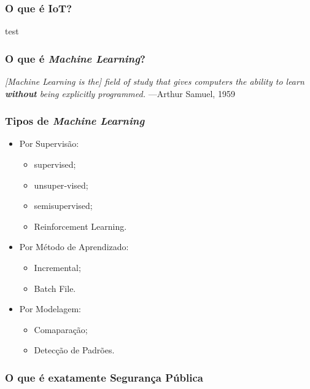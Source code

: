 \begin{frame}
	\frametitle{O que é IoT?}
	test
\end{frame}

\begin{frame}
	\frametitle{O que é \textit{Machine Learning}?}
	\textit{[Machine  Learning  is  the]  field  of  study  that  gives  computers  the  ability  to  learn
	\textbf{without} being explicitly programmed.}
	—Arthur Samuel, 1959
\end{frame}

\begin{frame}
	\frametitle{Tipos de \textit{Machine Learning}}
	\begin{itemize}[<+->]
		\item Por Supervisão:
			\begin{itemize}[<+->]
				\item supervised;
				\item unsuper‐vised;
				\item semisupervised;
				\item Reinforcement Learning.
			\end{itemize}	
		\item Por Método de Aprendizado:
			\begin{itemize}[<+->]
				\item Incremental;
				\item Batch File.
			\end{itemize}
		\item Por Modelagem:
		\begin{itemize}[<+->]
			\item Comaparação;
			\item Detecção de Padrões.
		\end{itemize}
	\end{itemize}	
\end{frame}

\begin{frame}
	\frametitle{O que é exatamente Segurança Pública}
\end{frame}